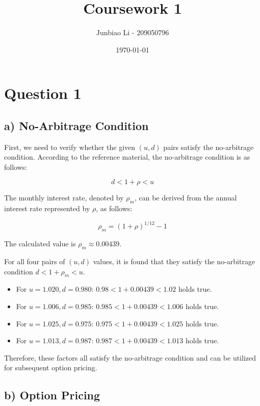 \documentclass[12pt]{article}
\title{Coursework 1}
\author{Junbiao Li - 209050796}
\date{\today}
\begin{document}
% 

\maketitle

\section{Question 1}

\subsection{a) No-Arbitrage Condition}

First, we need to verify whether the given \( (u, d) \) pairs satisfy the
no-arbitrage condition. According to the reference material, the no-arbitrage
condition is as follows:

\[
    d < 1 + \rho < u
\]

The monthly interest rate, denoted by \(\rho_m\), can be derived from the annual interest
rate represented by \(\rho\), as follows:

\[
    \rho_m = \left(1 + \rho\right)^{1/12} - 1
\]

The calculated value is \(\rho_m \approx 0.00439\).

For all four pairs of \( (u, d) \) values, it is found that they satisfy the
no-arbitrage condition \( d < 1 + \rho_m < u \).

\begin{itemize}
    \item For \(u = 1.020, d = 0.980\): \(0.98 < 1 + 0.00439 < 1.02\) holds
          true.
    \item For \(u = 1.006, d = 0.985\): \(0.985 < 1 + 0.00439 < 1.006\)
          holds true.
    \item For \(u = 1.025, d = 0.975\): \(0.975 < 1 + 0.00439 < 1.025\)
          holds true.
    \item For \(u = 1.013, d = 0.987\): \(0.987 < 1 + 0.00439 < 1.013\)
          holds true.
\end{itemize}

Therefore, these factors all satisfy the no-arbitrage condition and can be
utilized for subsequent option pricing.

\subsection{b) Option Pricing}
\end{document}
